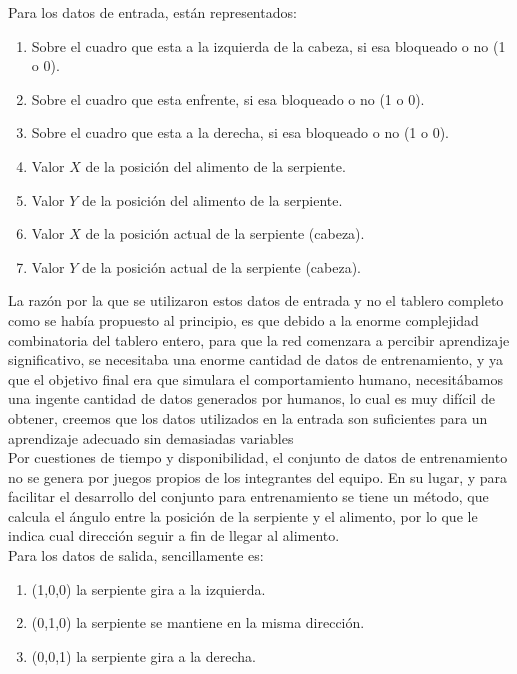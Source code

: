 \documentclass[12pt]{article}
\begin{document}
        Para los datos de entrada, están representados:
        \begin{enumerate}
            \item Sobre el cuadro que esta a la izquierda de la cabeza, si esa bloqueado o no (1 o 0).
            \item Sobre el cuadro que esta enfrente, si esa bloqueado o no (1 o 0).
            \item Sobre el cuadro que esta a la derecha, si esa bloqueado o no (1 o 0).
            \item Valor $X$ de la posición del alimento de la serpiente.
            \item Valor $Y$ de la posición del alimento de la serpiente.
            \item Valor $X$ de la posición actual de la serpiente (cabeza).
            \item Valor $Y$ de la posición actual de la serpiente (cabeza).
        \end{enumerate}
        La razón por la que se utilizaron estos datos de entrada y no el tablero completo como se había propuesto al principio, es que debido a la enorme complejidad combinatoria del tablero entero, para que la red comenzara a percibir aprendizaje significativo, se necesitaba una enorme cantidad de datos de entrenamiento, y ya que el objetivo final era que simulara el comportamiento humano, necesitábamos una ingente cantidad de datos generados por humanos, lo cual es muy difícil de obtener, creemos que los datos utilizados en la entrada son suficientes para un aprendizaje adecuado sin demasiadas variables\\
        
        Por cuestiones de tiempo y disponibilidad, el conjunto de datos de entrenamiento no se genera por juegos propios de los integrantes del equipo. En su lugar, y para facilitar el desarrollo del conjunto para entrenamiento se tiene un método, que calcula el ángulo entre la posición de la serpiente y el alimento, por lo que le indica cual dirección seguir a fin de llegar al alimento.\\
        
        Para los datos de salida, sencillamente es:
        \begin{enumerate}
            \item (1,0,0) la serpiente gira a la izquierda.
            \item (0,1,0) la serpiente se mantiene en la misma dirección.
            \item (0,0,1) la serpiente gira a la derecha.
        \end{enumerate}
        
\end{document}
